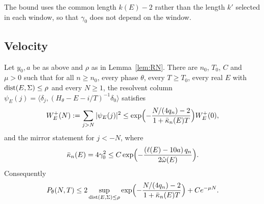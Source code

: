 The bound uses the common length $k(E)-2$ rather than the length $k'$ selected in each window, so that $\gamma_0$ does not depend on the window.

\subsection{Velocity}

\begin{theorem}\label{thm:V}
Let $y_0,a$ be as above and $\rho$ as in Lemma~\ref{lem:RN}. There are $n_0$, $T_0$, $C$ and $\mu>0$ such that for all $n\ge n_0$, every phase $\theta$, every $T\ge T_0$, every real $E$ with $\operatorname{dist}(E,\Sigma)\le\rho$ and every $N\ge1$, the resolvent column $\psi_E(j)=\langle\delta_j,(H_\theta-E-i/T)^{-1}\delta_0\rangle$ satisfies
\[
W^+_E(N):=\sum_{j>N}|\psi_E(j)|^2\le\exp\Bigl(-\frac{N/(4q_n)-2}{1+\bar\kappa_n(E)T}\Bigr)W^+_E(0),
\]
and the mirror statement for $j<-N$, where
\[
\bar\kappa_n(E)=4\gamma_0^2\le C\exp\Bigl(-\frac{(\ell(E)-10a)\,q_n}{2\hat\omega(E)}\Bigr).
\]
Consequently
\[
P_\theta(N,T)\le2\sup_{\operatorname{dist}(E,\Sigma)\le\rho}\exp\Bigl(-\frac{N/(4q_n)-2}{1+\bar\kappa_n(E)T}\Bigr)+Ce^{-\mu N}.
\]
\end{theorem}

